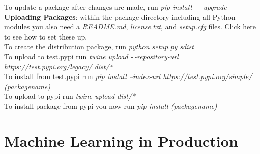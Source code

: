 \documentclass[11pt, a4paper]{article}
\begin{document}
\begin{spacing}{1.1}
	To update a package after changes are made, run \textit{pip install -\,- upgrade}\vspace*{2mm}\\
	\textbf{Uploading Packages}: within the package directory including all Python modules you also need a \textit{README.md}, \textit{license.txt}, and \textit{setup.cfg} files. \href{https://packaging.python.org/tutorials/packaging-projects/}{Click here} to see how to set these up.\\
	To create the distribution package, run \textit{python setup.py sdist}\\
	To upload to test.pypi run \textit{twine upload -\,-repository-url https://test.pypi.org/legacy/ dist/*}\\
	To install from test.pypi run \textit{pip install --index-url https://test.pypi.org/simple/ (packagename)}\\
	To upload to pypi run \textit{twine upload dist/*}\\
	To install package from pypi you now run \textit{pip install (packagename)}	\newpage
	
	\section{Machine Learning in Production}

\end{spacing}
\end{document}
